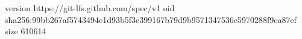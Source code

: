 version https://git-lfs.github.com/spec/v1
oid sha256:99bb267af5743494e1d93b5f3e399167b79d9b9571347536c5970288f9ca87ef
size 610614
